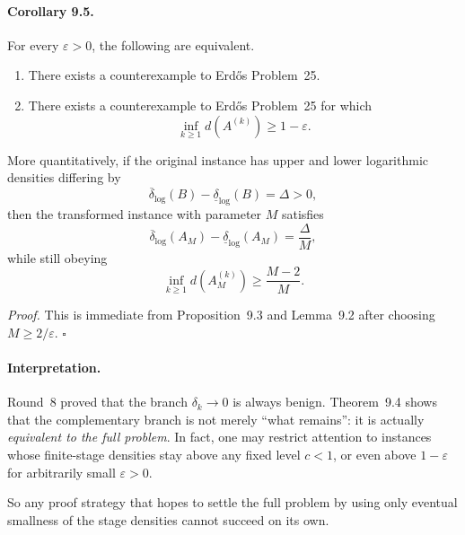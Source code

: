 \paragraph{Corollary 9.5.}
For every $\varepsilon>0$, the following are equivalent.
\begin{enumerate}
\item[(a)] There exists a counterexample to Erd\H{o}s Problem~25.
\item[(b)] There exists a counterexample to Erd\H{o}s Problem~25 for which
\begin{equation}
\inf_{k\ge 1} d(A^{(k)})\ge 1-\varepsilon.
\tag{9.17}
\end{equation}
\end{enumerate}
More quantitatively, if the original instance has upper and lower logarithmic densities differing by
\begin{equation}
\overline{\delta}_{\log}(B)-\underline{\delta}_{\log}(B)=\Delta>0,
\tag{9.18}
\end{equation}
then the transformed instance with parameter $M$ satisfies
\begin{equation}
\overline{\delta}_{\log}(A_M)-\underline{\delta}_{\log}(A_M)=\frac{\Delta}{M},
\tag{9.19}
\end{equation}
while still obeying
\begin{equation}
\inf_{k\ge 1} d(A_M^{(k)})\ge \frac{M-2}{M}.
\tag{9.20}
\end{equation}

\emph{Proof.}
This is immediate from Proposition~9.3 and Lemma~9.2 after choosing $M\ge 2/\varepsilon$. \hfill $\square$

\paragraph{Interpretation.}
Round~8 proved that the branch $\delta_k\to 0$ is always benign.  Theorem~9.4 shows that the complementary branch is not merely ``what remains'': it is actually \emph{equivalent to the full problem}.  In fact, one may restrict attention to instances whose finite-stage densities stay above any fixed level $c<1$, or even above $1-\varepsilon$ for arbitrarily small $\varepsilon>0$.

So any proof strategy that hopes to settle the full problem by using only eventual smallness of the stage densities cannot succeed on its own.

